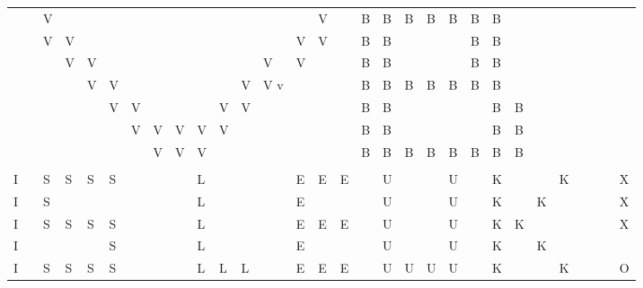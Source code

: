 \begin{tabular}{lllllllllllllllllllllllllllll}
&&V&&&&&&&&&&&&V&&B&B&B&B&B&B&B&&&&&&&\\
&&V&V&&&&&&&&&&V&V&&B&B&&&&B&B&&&&&&&\\
&&&V&V&&&&&&&&V&V&&&B&B&&&&B&B&&&&&&&\\
&&&&V&V&&&&&&V&V v&&&&B&B&B&B&B&B&B&&&&&&&\\
&&&&&V&V&&&&V&V&&&&&B&B&&&&&B&B&&&&&&\\
&&&&&&V&V&V&V&V&&&&&&B&B&&&&&B&B&&&&&&\\
&&&&&&&V&V&V&&&&&&&B&B&B&B&B&B&B&B&&&&&&\\
&&&&&&&&&&&&&&&&&&&&&&&&&&&\\
I&&S&S&S&S&&&&L&&&&E&E&E&&U&&&U&&K&&&K&&&&X\\
I&&S&&&&&&&L&&&&E&&&&U&&&U&&K&&K&&&&&X\\
I&&S&S&S&S&&&&L&&&&E&E&E&&U&&&U&&K&K&&&&&&X\\
I&&&&&S&&&&L&&&&E&&&&U&&&U&&K&&K&&&&&\\
I&&S&S&S&S&&&&L&L&L&&E&E&E&&U&U&U&U&&K&&&K&&&&O\\
\end{tabular}
